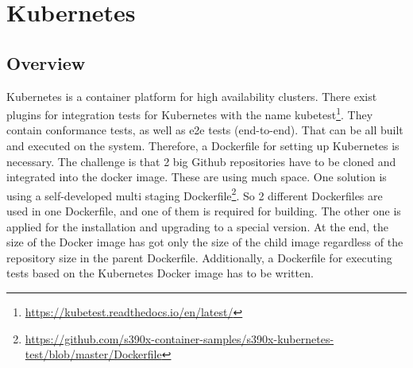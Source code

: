 \chapter{Kubernetes}\label{ch:kubernetes}

\section{Overview}

Kubernetes is a container platform for high availability clusters.
There exist plugins for integration tests for Kubernetes with the name kubetest\footnote{\url{https://kubetest.readthedocs.io/en/latest/}}. They contain conformance tests, as well as e2e tests (end-to-end).
That can be all built and executed on the system. Therefore, a Dockerfile for setting up Kubernetes is necessary. The challenge is that 2 big Github repositories have to be cloned and integrated into the docker image. These are using much space. One solution is using a self-developed multi staging Dockerfile\footnote{\url{https://github.com/s390x-container-samples/s390x-kubernetes-test/blob/master/Dockerfile}}. 
So 2 different Dockerfiles are used in one Dockerfile, and one of them is required for building. The other one is applied for the installation and upgrading to a special version. At the end, the size of the Docker image has got only the size of the child image regardless of the repository size in the parent Dockerfile.
Additionally, a Dockerfile for executing tests based on the Kubernetes Docker image has to be written.

